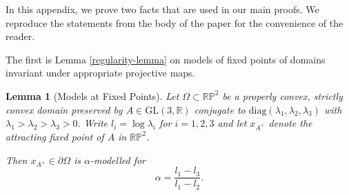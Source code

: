 \documentclass[12pt,a4paper]{amsart}
\theoremstyle{definition}
\theoremstyle{plain}
\newtheorem{lemma}[theorem]{Lemma}
\numberwithin{equation}{section}
\begin{document}
In this appendix, we prove two facts that are used in our main proofs. We reproduce the statements from the body of the paper for the convenience of the reader.

The first is Lemma \ref{regularity-lemma} on models of fixed points of domains invariant under appropriate projective maps.

\begin{lemma}[Models at Fixed Points] Let $\Omega \subset \mathbb{RP}^2$ be a properly convex, strictly convex domain preserved by {\rm{$A \in \text{GL}(3, \mathbb{R})$}} conjugate to {\rm$\text{diag}(\lambda_1, \lambda_2, \lambda_3)$ with $\lambda_1 > \lambda_2 > \lambda_3 > 0$}. Write $l_i = \log \lambda_i $ for $i = 1,2,3$ and let $x_{A^+}$ denote the attracting fixed point of $A$ in $\mathbb{RP}^2$.

Then $x_{A^+} \in \partial \Omega$ is $\alpha$-modelled for $$\alpha = \frac{l_1 - l_3}{l_1 - l_2}.$$
\end{lemma} 
\end{document}
